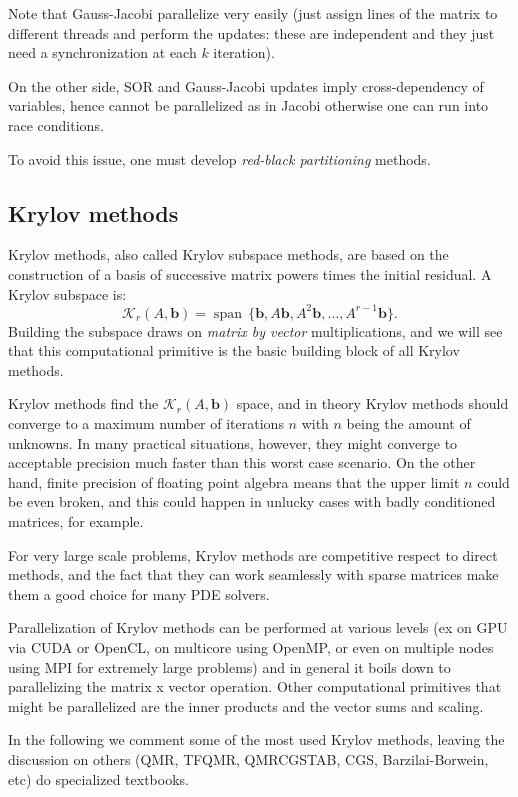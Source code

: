 \documentclass{digitaldynamics}
\def\vect#1{\bm{#1}}
\begin{document}
Note that Gauss-Jacobi parallelize very easily (just assign lines of the matrix to different threads and perform the updates: these are independent and they just need a synchronization at each $k$ iteration).

On the other side, SOR and Gauss-Jacobi updates imply cross-dependency of variables, hence cannot be parallelized as in Jacobi otherwise one can run into race conditions. 

To avoid this issue, one must develop \textit{red-black partitioning} methods.




\subsection{Krylov methods}

Krylov methods, also called Krylov subspace methods, are based on the construction of a basis of successive matrix powers times the initial residual. A Krylov subspace is:
\[
\mathcal{K}_r(A,\vect{b}) = \operatorname{span} \, \{ \vect{b}, A\vect{b}, A^2\vect{b}, \ldots, A^{r-1}\vect{b} \}. 
\]
Building the subspace draws on \textit{matrix by vector} multiplications, and we will see that this computational primitive is the basic building block of all Krylov methods.

Krylov methods find the $\mathcal{K}_r(A,\vect{b})$ space, and in theory Krylov methods should converge to a maximum number of iterations $n$ with $n$ being the amount of unknowns. In many practical situations, however, they might converge to acceptable precision much faster than this worst case scenario. On the other hand, finite precision of floating point algebra means that the upper limit $n$ could be even broken, and this could happen in unlucky cases with badly conditioned matrices, for example.

For very large scale problems, Krylov methods are competitive respect to direct methods, and the fact that they can work seamlessly with sparse matrices make them a good choice for many PDE solvers.

Parallelization of Krylov methods can be performed at various levels (ex on GPU via CUDA or OpenCL, on multicore using OpenMP, or even on multiple nodes using MPI for extremely large problems) and in general it boils down to parallelizing the matrix x vector operation. Other computational primitives that might be parallelized are the inner products and the vector sums and scaling.

In the following we comment some of the most used Krylov methods, leaving the discussion on others (QMR, TFQMR, QMRCGSTAB, CGS, Barzilai-Borwein, etc) do specialized textbooks.
\end{document}
